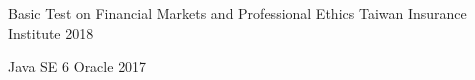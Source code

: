 

\begin{cvhonors}

  \cvhonor
    {Basic Test on Financial Markets and Professional Ethics} %
    {Taiwan Insurance Institute} %
    {} %
    {2018} %

  \cvhonor
    {Java SE 6} %
    {Oracle} %
    {} %
    {2017} %





\end{cvhonors}
